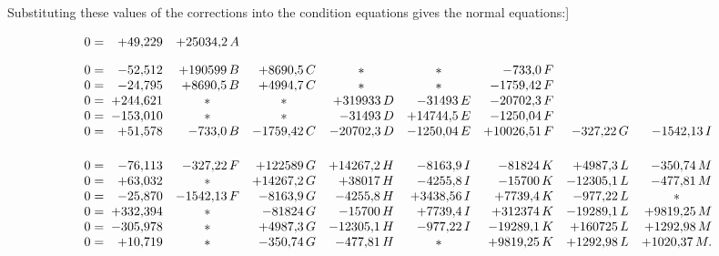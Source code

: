 Substituting these values of the corrections into the condition equations
gives the normal equations:]

\begin{landscape}
\begingroup
\setlength{\arraycolsep}{2.5pt}
\renewcommand{\arraystretch}{1.45}
\[
\begin{array}{r@{\;}r*{7}{r}}
0={} & +49{,}229 & +25034{,}2\,A & & & & & &\\[1em]
0={} & -52{,}512 & +190599\,B & +8690{,}5\,C & \multicolumn{1}{c}{\ast} & \multicolumn{1}{c}{\ast} & -733{,}0\,F & &\\
0={} & -24{,}795 & +8690{,}5\,B & +4994{,}7\,C & \multicolumn{1}{c}{\ast} & \multicolumn{1}{c}{\ast} & -1759{,}42\,F & &\\
0={} & +244{,}621 & \multicolumn{1}{c}{\ast} & \multicolumn{1}{c}{\ast} & +319933\,D & -31493\,E & -20702{,}3\,F & &\\
0={} & -153{,}010 & \multicolumn{1}{c}{\ast} & \multicolumn{1}{c}{\ast} & -31493\,D & +14744{,}5\,E & -1250{,}04\,F & &\\
0={} & +51{,}578 & -733{,}0\,B & -1759{,}42\,C & -20702{,}3\,D & -1250{,}04\,E & +10026{,}51\,F & -327{,}22\,G & -1542{,}13\,I
\\[1.5em]
0={} & -76{,}113 & -327{,}22\,F & +122589\,G & +14267{,}2\,H & -8163{,}9\,I & -81824\,K & +4987{,}3\,L & -350{,}74\,M\\
0={} & +63{,}032 & \multicolumn{1}{c}{\ast} & +14267{,}2\,G & +38017\,H & -4255{,}8\,I & -15700\,K & -12305{,}1\,L & -477{,}81\,M\\
0={} & -25{,}870 & -1542{,}13\,F & -8163{,}9\,G & -4255{,}8\,H & +3438{,}56\,I & +7739{,}4\,K & -977{,}22\,L & \multicolumn{1}{c}{\ast}\\
0={} & +332{,}394 & \multicolumn{1}{c}{\ast} & -81824\,G & -15700\,H & +7739{,}4\,I & +312374\,K & -19289{,}1\,L & +9819{,}25\,M\\
0={} & -305{,}978 & \multicolumn{1}{c}{\ast} & +4987{,}3\,G & -12305{,}1\,H & -977{,}22\,I & -19289{,}1\,K & +160725\,L & +1292{,}98\,M\\
0={} & +10{,}719 & \multicolumn{1}{c}{\ast} & -350{,}74\,G & -477{,}81\,H & \multicolumn{1}{c}{\ast} & +9819{,}25\,K & +1292{,}98\,L & +1020{,}37\,M.
\end{array}
\]
\endgroup
\end{landscape}
